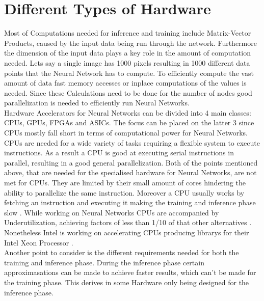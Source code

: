 \documentclass[conference]{IEEEtran}
\begin{document}
\section{Different Types of Hardware}
Most of Computations needed for inference and training include Matrix-Vector Products, caused by the input data being run through the network.
Furthermore  the dimension of the input data plays a key role in the amount of computation needed. Lets say a single image has 1000 pixels resulting in 1000 different data points that the Neural Network has to compute. To efficiently compute the vast amount of data fast memory accesses or inplace computations of the values is needed. Since these Calculations need to be done for the number of nodes good parallelization is needed to efficiently run Neural Networks.
\\
Hardware Accelerators for Neural Networks can be divided into 4 main classes: CPUs, GPUs, FPGAs and ASICs. The focus can be placed on the latter 3 since CPUs mostly fall short in terms of computational power for Neural Networks. 
CPUs are needed for a wide variety of tasks requiring a flexible system to execute instructions. As a result a CPU is good at executing serial instructions in parallel, resulting in a good general parallelization.
Both of the points mentioned above, that are needed for the specialised hardware for Neural Networks, are not met for CPUs. They are limited by their small amount of cores hindering the ability to parallelize the same instruction. Moreover a CPU usually works by fetching an instruction and executing it making the training and inference phase slow \cite{capra2020updated}. While working on Neural Networks CPUs are accompanied by Underutilization, achieving factors of less than 1/10 of that other alternatives \cite{nurvitadhi2016accelerating}. Nonetheless Intel is working on accelerating CPUs producing librarys for their Intel Xeon Processor \cite{intelnn}.
\\
Another point to consider is the different requirements needed for both the training and inference phase. During the inference phase certain approximasations can be made to achieve faster results, which can't be made for the training phase. This derives in some Hardware only being designed for the inference phase. 
\end{document}
